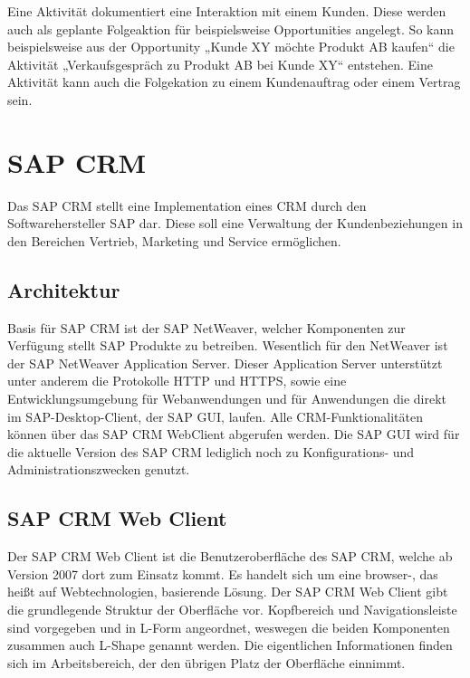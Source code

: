 Eine Aktivität dokumentiert eine Interaktion mit einem Kunden. Diese werden auch als geplante Folgeaktion für beispielsweise Opportunities angelegt. So kann beispielsweise aus der Opportunity „Kunde XY möchte Produkt AB kaufen“ die Aktivität „Verkaufsgespräch zu Produkt AB bei Kunde XY“ entstehen. Eine Aktivität kann auch die Folgekation zu einem Kundenauftrag oder einem Vertrag sein. \cite[S.237]{Kale.2014}

\section{SAP CRM}

Das SAP \ac{CRM} stellt eine Implementation eines \ac{CRM} durch den Softwarehersteller SAP dar. Diese soll eine Verwaltung der Kundenbeziehungen in den Bereichen Vertrieb, Marketing und Service ermöglichen. \cite[S. 45]{Katta.2009}

\subsection{Architektur}

Basis für SAP \ac{CRM} ist der SAP NetWeaver, welcher Komponenten zur Verfügung stellt SAP Produkte zu betreiben. Wesentlich für den NetWeaver ist der SAP NetWeaver Application Server. \cite[S.241]{Katta.2009} Dieser Application Server unterstützt unter anderem die Protokolle \ac{HTTP} und \ac{HTTPS}, sowie eine Entwicklungsumgebung für Webanwendungen und für Anwendungen die direkt im SAP-Desktop-Client, der SAP GUI, laufen. \cite[S. 247-248]{Katta.2009}
Alle \ac{CRM}-Funktionalitäten können über das SAP \ac{CRM} WebClient abgerufen werden. Die SAP GUI wird für die aktuelle Version des SAP \ac{CRM} lediglich noch zu Konfigurations- und Administrationszwecken genutzt. \cite[S.261]{Katta.2009}

\subsection{SAP CRM Web Client}

Der SAP \ac{CRM} Web Client ist die Benutzeroberfläche des SAP \ac{CRM}, welche ab Version 2007 dort zum Einsatz kommt. Es handelt sich um eine browser-, das heißt auf Webtechnologien, basierende Lösung. \cite[S. 21-22]{Fuchsle.2009}
Der SAP \ac{CRM} Web Client gibt die grundlegende Struktur der Oberfläche vor. Kopfbereich und Navigationsleiste sind vorgegeben und in L-Form angeordnet, weswegen die beiden Komponenten zusammen auch L-Shape genannt werden. \cite[S. 24]{Fuchsle.2009} Die eigentlichen Informationen finden sich im Arbeitsbereich, der den übrigen Platz der Oberfläche einnimmt. \cite[S. 25]{Fuchsle.2009}

